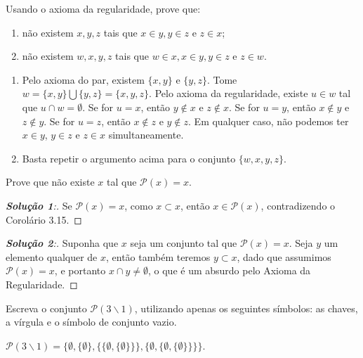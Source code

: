 \begin{exercicio}
	Usando o axioma da regularidade, prove que:
	\begin{enumerate}[label=(\alph{*})]
		\item não existem $x,y,z$ tais que $x\in y,y\in z$ e $z\in x$;
		\item não existem $w,x,y,z$ tais que $w\in x,x\in y,y\in z$ e $z\in w$.
	\end{enumerate}
\end{exercicio}
\begin{solucao}
	\begin{enumerate}[label=(\alph{*})]
		\item Pelo axioma do par, existem $\{x,y\}$ e $\{y,z\}$. Tome $w=\{x,y\}\bigcup \{y,z\}=\{x,y,z\}$. Pelo axioma da regularidade, existe $u\in w$ tal que $u\cap w=\emptyset$. Se for $u=x$, então $y\notin x$ e $z\notin x$. Se for $u=y$, então $x\notin y$ e $z\notin y$. Se for $u=z$, então $x\notin z$ e $y\notin z$. Em qualquer caso, não podemos ter $x\in y$, $y\in z$ e $z\in x$ simultaneamente.
		\item Basta repetir o argumento acima para o conjunto $\{w,x,y,z\}$.
	\end{enumerate}
\end{solucao}

\begin{exercicio}
	Prove que não existe $x$ tal que $\mathcal{P}(x)=x$.
\end{exercicio}
\begin{proof}[\textbf{Solução 1}:]
	Se $\mathcal{P}(x)=x$, como $x\subset x$, então $x\in \mathcal{P}(x)$, contradizendo o Corolário 3.15.
\end{proof}
\begin{proof}[\textbf{Solução 2}:]
	Suponha que $x$ seja um conjunto tal que $\mathcal{P}(x)=x$. Seja $y$ um elemento qualquer de $x$, então também teremos $y \subset x$, dado que assumimos $\mathcal{P}(x)=x$, e portanto $x \cap y \neq \emptyset$, o que é um absurdo pelo Axioma da Regularidade.
\end{proof}

\begin{exercicio}
	Escreva o conjunto $\mathcal{P}(3\backslash 1)$, utilizando apenas os seguintes símbolos: as chaves, a vírgula e o símbolo de conjunto vazio.
\end{exercicio}
\begin{solucao}
	$\mathcal{P}(3\backslash 1)=\{\emptyset,\{\emptyset\},\{\{\emptyset,\{\emptyset\}\}\},\{\emptyset,\{\emptyset,\{\emptyset\}\}\}\}$.
\end{solucao}


